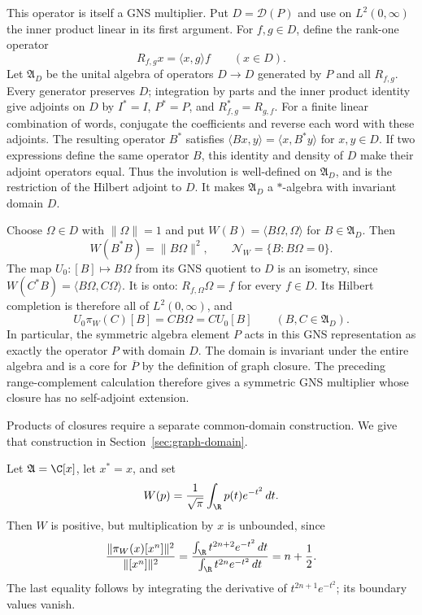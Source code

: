 This operator is itself a GNS multiplier.  Put $D=\mathcal D(P)$ and use
on $L^2(0,\infty)$ the inner product linear in its first argument.
For $f,g\in D$, define the rank-one operator
\[
 R_{f,g}x=\langle x,g\rangle f\qquad(x\in D).
\]
Let $\mathfrak A_D$ be the unital algebra of operators $D\to D$
generated by $P$ and all $R_{f,g}$.  Every generator preserves $D$;
integration by parts and the inner product identity give adjoints on $D$
by $I^*=I$, $P^*=P$, and $R_{f,g}^*=R_{g,f}$.  For a finite linear combination of
words, conjugate the coefficients and reverse each word with these
adjoints.  The resulting operator $B^*$ satisfies
$\langle Bx,y\rangle=\langle x,B^*y\rangle$ for $x,y\in D$.
If two expressions define the same operator $B$, this identity and density
of $D$ make their adjoint operators equal.  Thus the involution is
well-defined on $\mathfrak A_D$, and is the restriction of the Hilbert
adjoint to $D$.  It makes $\mathfrak A_D$ a $*$-algebra with invariant
domain $D$.

Choose $\Omega\in D$ with $\|\Omega\|=1$ and put
$W(B)=\langle B\Omega,\Omega\rangle$ for $B\in\mathfrak A_D$.
Then
\[
 W(B^*B)=\|B\Omega\|^2,\qquad
 \mathcal N_W=\{B:B\Omega=0\}.
\]
The map $U_0:[B]\mapsto B\Omega$ from its GNS quotient to $D$ is an
isometry, since
$W(C^*B)=\langle B\Omega,C\Omega\rangle$.
It is onto: $R_{f,\Omega}\Omega=f$ for every $f\in D$.
Its Hilbert completion is therefore all of $L^2(0,\infty)$, and
\[
 U_0\pi_W(C)[B]=CB\Omega=C U_0[B]
 \qquad(B,C\in\mathfrak A_D).
\]
In particular, the symmetric algebra element $P$ acts in this GNS
representation as exactly the operator $P$ with domain $D$.
The domain is invariant under the entire algebra and is a core for
$\overline P$ by the definition of graph closure.  The preceding
range-complement calculation therefore gives a symmetric GNS multiplier
whose closure has no self-adjoint extension.

Products of closures require a separate common-domain construction.
We give that construction in Section~\ref{sec:graph-domain}.

\begin{example}
Let $\mathfrak A=\C[x]$, let $x^*=x$, and set
\[
 W(p)=\frac1{\sqrt\pi}\int_{\R}p(t)e^{-t^2}\,dt.
\]
Then $W$ is positive, but multiplication by $x$ is unbounded, since
\[
 \frac{\|\pi_W(x)[x^n]\|^2}{\|[x^n]\|^2}
 =\frac{\int_{\R}t^{2n+2}e^{-t^2}\,dt}
        {\int_{\R}t^{2n}e^{-t^2}\,dt}
 =n+\frac12.
\]
The last equality follows by integrating the derivative of
$t^{2n+1}e^{-t^2}$; its boundary values vanish.
\end{example}

